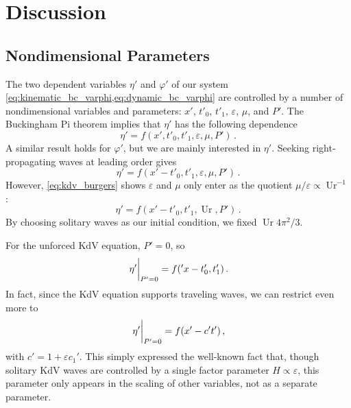 \documentclass{jfm}
\DeclareMathOperator{\Ur}{Ur}
\renewcommand*{\epsilon}{\varepsilon}
\begin{document}
\section{Discussion}

\subsection{Nondimensional Parameters}
The two dependent variables $\eta'$ and $\varphi'$ of our system
\cref{eq:kinematic_bc_varphi,eq:dynamic_bc_varphi} are controlled by a
number of nondimensional variables and parameters: $x'$, $t'_0$, $t'_1$,
$\epsilon$, $\mu$, and $P'$.
The Buckingham Pi theorem implies that $\eta'$ has the following
dependence
\begin{equation}
  \eta' = f(x', t'_0, t'_1, \epsilon, \mu, P') \,.
\end{equation}
A similar result holds for $\varphi'$, but we are mainly interested in
$\eta'$.
Seeking right-propagating waves at leading order gives
\begin{equation}
  \eta' = f(x'-t'_0, t'_1, \epsilon, \mu, P') \,.
\end{equation}
However, \cref{eq:kdv_burgers} shows $\epsilon$ and $\mu$ only enter as
the quotient $\mu/\epsilon \propto \Ur^{-1}$:
\begin{equation}
  \eta' = f(x'-t'_0, t'_1, \Ur, P') \,.
  \label{eq:kdvb_sol_buckingham}
\end{equation}
By choosing solitary waves as our initial condition, we fixed $\Ur
4\pi^2/3$.

For the unforced KdV equation, $P'=0$, so
\begin{equation}
  \eval{\eta'}_{P'=0} = f('x - t'_0, t'_1) \,.
\end{equation}
In fact, since the KdV equation supports traveling waves, we can
restrict even more to
\begin{equation}
  \eval{\eta'}_{P'=0} = f(x'-c' t') \,,
\end{equation}
with $c' = 1 + \epsilon c_1'$.
This simply expressed the well-known fact that, though solitary KdV
waves are controlled by a single factor parameter $H \propto \epsilon$,
this parameter only appears in the scaling of other variables, \ie not
as a separate parameter.
\end{document}

